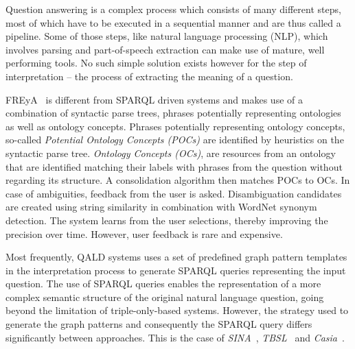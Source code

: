 \documentclass{acm_proc_article-sp}
\begin{document}
Question answering is a complex process which consists of many different steps, most of which have to be executed in a sequential manner and are thus called a pipeline.
Some of those steps, like natural language processing (NLP), which involves parsing and part-of-speech extraction can make use of mature, well performing tools.
No such simple solution exists however for the step of interpretation -- the process of extracting the meaning of a question.


FREyA~\cite{freya} is different from SPARQL driven systems and makes use of a combination of syntactic parse trees, phrases potentially representing ontologies as well as ontology concepts.
Phrases potentially representing ontology concepts, so-called \emph{Potential Ontology Concepts (POCs)} are identified by heuristics on the syntactic parse tree.
\emph{Ontology Concepts (OCs)}, are resources from an ontology that are identified matching their labels with phrases from the question without regarding its structure.
A consolidation algorithm then matches POCs to OCs.
In case of ambiguities, feedback from the user is asked.
Disambiguation candidates are created using string similarity in combination with WordNet synonym detection.
The system learns from the user selections, thereby improving the precision over time.
However, user feedback is rare and expensive.

Most frequently, QALD systems uses a set of predefined graph pattern templates in the interpretation process to generate SPARQL queries representing the input question.
The use of SPARQL queries enables the representation of a more complex semantic structure of the original natural language question,
going beyond the limitation of triple-only-based systems.
However, the strategy used to generate the graph patterns and consequently the SPARQL query differs significantly between approaches.
This is the case of \emph{SINA}~\cite{SHE+13}, \emph{TBSL}~\cite{unger2012template} and \emph{Casia}~\cite{clef2013casia}.
\end{document}
